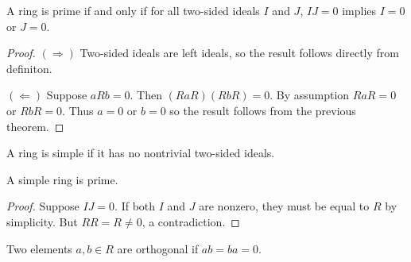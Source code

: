 \begin{theorem}
  \label{thm:prime_ring_equiv'}
  \leanok
  A ring is prime if and only if for all two-sided ideals $I$ and $J$, $IJ = 0$ implies $I = 0$ or $J = 0$.
\end{theorem}
\begin{proof}
  \leanok
  $(\Rightarrow)$ Two-sided ideals are left ideals, so the result follows directly from definiton.

  $(\Leftarrow)$ Suppose $aRb = 0$. Then $(RaR)(RbR) = 0$. By assumption $RaR = 0$ or $RbR = 0$. Thus $a = 0$ or $b = 0$ so the result follows from the previous theorem.
\end{proof}

\begin{definition}
  \label{def:IsSimpleRing}
  A ring is simple if it has no nontrivial two-sided ideals.
\end{definition}

\begin{theorem}
  \label{thm:simple_ring_is_prime}
  \leanok
  A simple ring is prime.
\end{theorem}
\begin{proof}
  \leanok
  Suppose $IJ = 0$. If both $I$ and $J$ are nonzero, they must be equal to $R$ by simplicity. But $RR = R \neq 0$, a contradiction.
\end{proof}

\begin{definition}
  \label{def:IsOrthogonal}
  Two elements $a, b \in R$ are orthogonal if $ab = ba = 0$.
\end{definition}

